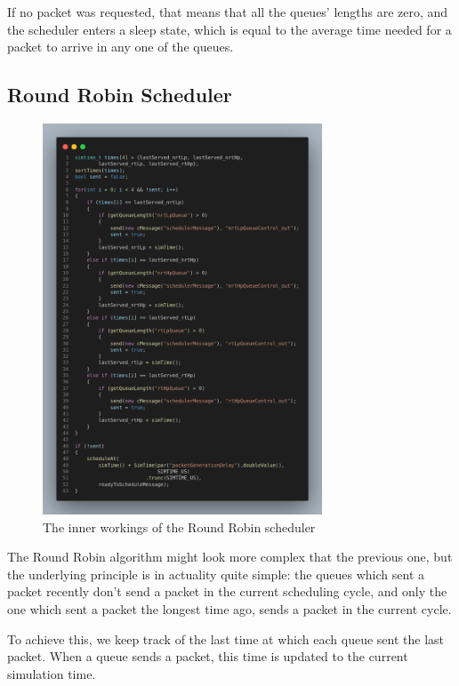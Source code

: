 \documentclass[12pt]{article}
\begin{document}
        If no packet was requested, that means that all the queues' lengths are zero, and the scheduler enters a sleep state, which is equal to the average time needed for a packet to arrive in any one of the queues.

        \subsection{Round Robin Scheduler}
        \begin{figure}[htbp!]
            \centering
            \includegraphics[width=0.74\textwidth]{images/rr_code.png}
            \caption{The inner workings of the Round Robin scheduler}
        \end{figure}
        \pagebreak
        The Round Robin algorithm might look more complex that the previous one, but the underlying principle is in actuality quite simple: the queues which sent a packet recently don't send a packet in the current scheduling cycle, and only the one which sent a packet the longest time ago, sends a packet in the current cycle.
        
        To achieve this, we keep track of the last time at which each queue sent the last packet. When a queue sends a packet, this time is updated to the current simulation time.
\end{document}
